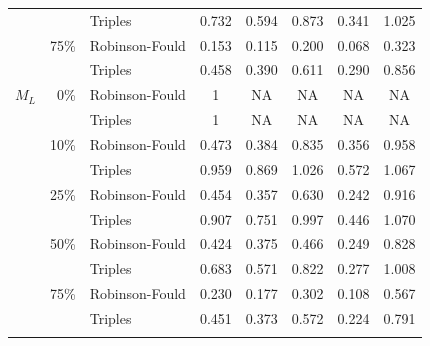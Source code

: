\documentclass[12pt,letterpaper]{article}
\begin{document}
\begin{table}
\begin{tabular}{rrlccccc}
              &              & Triples        & 0.732 & 0.594  & 0.873 & 0.341  & 1.025 \\
              & 75\%         & Robinson-Fould & 0.153 & 0.115  & 0.200 & 0.068  & 0.323 \\
              &              & Triples        & 0.458 & 0.390  & 0.611 & 0.290  & 0.856 \\   
    $M_L$     & 0\%          & Robinson-Fould & 1 & NA  & NA & NA  & NA \\
              &              & Triples        & 1 & NA  & NA & NA  & NA \\
              & 10\%         & Robinson-Fould & 0.473 & 0.384  & 0.835 & 0.356  & 0.958 \\
              &              & Triples        & 0.959 & 0.869  & 1.026 & 0.572  & 1.067 \\
              & 25\%         & Robinson-Fould & 0.454 & 0.357  & 0.630 & 0.242  & 0.916 \\
              &              & Triples        & 0.907 & 0.751  & 0.997 & 0.446  & 1.070 \\
              & 50\%         & Robinson-Fould & 0.424 & 0.375  & 0.466 & 0.249  & 0.828 \\
              &              & Triples        & 0.683 & 0.571  & 0.822 & 0.277  & 1.008 \\
              & 75\%         & Robinson-Fould & 0.230 & 0.177  & 0.302 & 0.108  & 0.567 \\
              &              & Triples        & 0.451 & 0.373  & 0.572 & 0.224  & 0.791 \\
    \hline
\label{NTS_ML_results}
\end{tabular}
\end{table}
\end{document}

